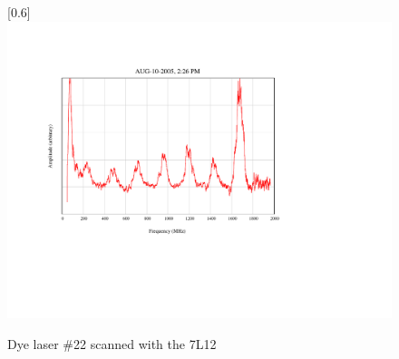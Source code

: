\begin{figure}
\scalebox{0.8}[0.6]{
\includegraphics[viewport=150 200 300 450, bb=85 160 300 550]
{22-12/22-12.pdf}
}
\caption{Dye laser \#22 scanned with the 7L12}
\label{22-12}
\end{figure}
